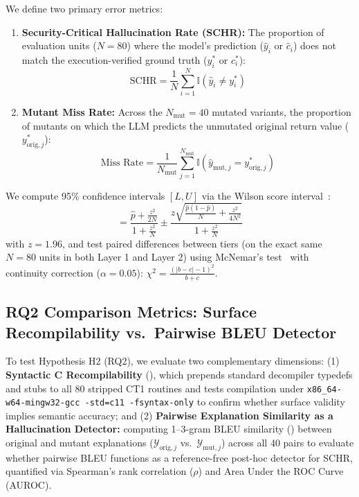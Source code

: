 \documentclass[conference]{IEEEtran}
\begin{document}
We define two primary error metrics:
\begin{enumerate}
    \item \textbf{Security-Critical Hallucination Rate (SCHR):} The proportion of evaluation units ($N=80$) where the model's prediction ($\hat{y}_i$ or $\hat{c}_i$) does not match the execution-verified ground truth ($y_i^*$ or $c_i^*$):
    \begin{equation}
    \text{SCHR} = \frac{1}{N} \sum_{i=1}^N \mathbb{I}\left( \hat{y}_i \neq y_i^* \right)
    \end{equation}
    \item \textbf{Mutant Miss Rate:} Across the $N_{\text{mut}} = 40$ mutated variants, the proportion of mutants on which the LLM predicts the unmutated original return value ($y_{\text{orig}, j}^*$):
    \begin{equation}
    \text{Miss Rate} = \frac{1}{N_{\text{mut}}} \sum_{j=1}^{N_{\text{mut}}} \mathbb{I}\left( \hat{y}_{\text{mut}, j} = y_{\text{orig}, j}^* \right)
    \end{equation}
\end{enumerate}
We compute 95\% confidence intervals $[L, U]$ via the Wilson score interval~\cite{wilson1927probable}:
\begin{equation}
[L, U] = \frac{\hat{p} + \frac{z^2}{2N}}{1 + \frac{z^2}{N}} \pm \frac{z \sqrt{\frac{\hat{p}(1-\hat{p})}{N} + \frac{z^2}{4N^2}}}{1 + \frac{z^2}{N}}
\end{equation}
with $z = 1.96$, and test paired differences between tiers (on the exact same $N=80$ units in both Layer 1 and Layer 2) using McNemar's test~\cite{mcnemar1947note} with continuity correction ($\alpha = 0.05$): $\chi^2 = \frac{(|b - c| - 1)^2}{b + c}$.

\subsection{RQ2 Comparison Metrics: Surface Recompilability vs.\ Pairwise BLEU Detector}
To test Hypothesis H2 (RQ2), we evaluate two complementary dimensions: (1) \textbf{Syntactic C Recompilability} (), which prepends standard decompiler typedefs and stubs to all 80 stripped CT1 routines and tests compilation under \texttt{x86\_64-w64-mingw32-gcc -std=c11 -fsyntax-only} to confirm whether surface validity implies semantic accuracy; and (2) \textbf{Pairwise Explanation Similarity as a Hallucination Detector:} computing 1--3-gram BLEU similarity () between original and mutant explanations ($\mathcal{Y}_{\text{orig}, j}$ vs.\ $\mathcal{Y}_{\text{mut}, j}$) across all 40 pairs to evaluate whether pairwise BLEU functions as a reference-free post-hoc detector for SCHR, quantified via Spearman's rank correlation ($\rho$) and Area Under the ROC Curve (AUROC).
\end{document}
